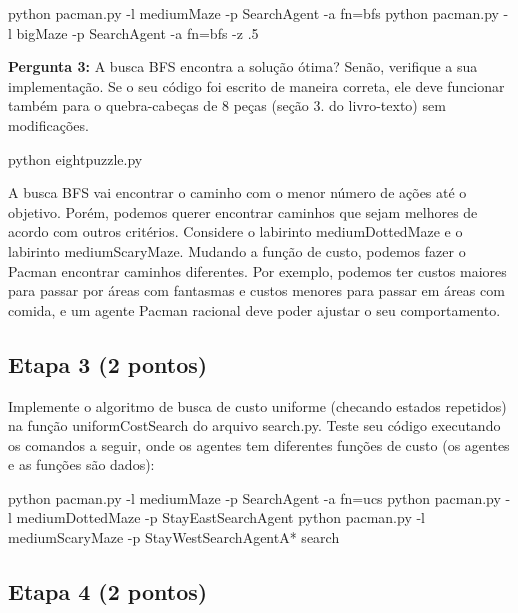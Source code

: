 \begin{DoxyCode}
python pacman.py -l mediumMaze -p SearchAgent -a fn=bfs
python pacman.py -l bigMaze -p SearchAgent -a fn=bfs -z .5
\end{DoxyCode}



\begin{DoxyItemize}
\item {\bfseries Pergunta 3\+:} A busca B\+FS encontra a solução ótima? Senão, verifique a sua implementação. Se o seu código foi escrito de maneira correta, ele deve funcionar também para o quebra-\/cabeças de 8 peças (seção 3. do livro-\/texto) sem modificações.
\end{DoxyItemize}


\begin{DoxyCode}
python eightpuzzle.py
\end{DoxyCode}


A busca B\+FS vai encontrar o caminho com o menor número de ações até o objetivo. Porém, podemos querer encontrar caminhos que sejam melhores de acordo com outros critérios. Considere o labirinto medium\+Dotted\+Maze e o labirinto medium\+Scary\+Maze. Mudando a função de custo, podemos fazer o Pacman encontrar caminhos diferentes. Por exemplo, podemos ter custos maiores para passar por áreas com fantasmas e custos menores para passar em áreas com comida, e um agente Pacman racional deve poder ajustar o seu comportamento.

\subsection*{Etapa 3 (2 pontos)}

Implemente o algoritmo de busca de custo uniforme (checando estados repetidos) na função {\ttfamily uniform\+Cost\+Search} do arquivo {\ttfamily search.\+py}. Teste seu código executando os comandos a seguir, onde os agentes tem diferentes funções de custo (os agentes e as funções são dados)\+:


\begin{DoxyCode}
python pacman.py -l mediumMaze -p SearchAgent -a fn=ucs
python pacman.py -l mediumDottedMaze -p StayEastSearchAgent
python pacman.py -l mediumScaryMaze -p StayWestSearchAgentA* search
\end{DoxyCode}


\subsection*{Etapa 4 (2 pontos)}

